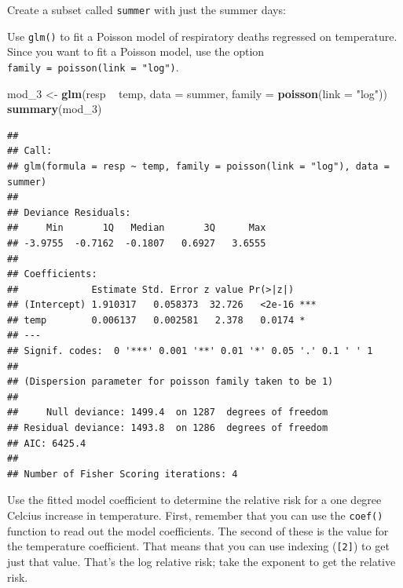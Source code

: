 \documentclass[]{book}
\makeatletter
\newenvironment{Shaded}{\begin{snugshade}}{\end{snugshade}}
\newcommand{\KeywordTok}[1]{\textcolor[rgb]{0.13,0.29,0.53}{\textbf{{#1}}}}
\newcommand{\DataTypeTok}[1]{\textcolor[rgb]{0.13,0.29,0.53}{{#1}}}
\newcommand{\DecValTok}[1]{\textcolor[rgb]{0.00,0.00,0.81}{{#1}}}
\newcommand{\StringTok}[1]{\textcolor[rgb]{0.31,0.60,0.02}{{#1}}}
\newcommand{\NormalTok}[1]{{#1}}
\newenvironment{kframe}{%
\medskip{}
\setlength{\fboxsep}{.8em}
 \def\at@end@of@kframe{}%
 \ifinner\ifhmode%
  \def\at@end@of@kframe{\end{minipage}}%
  \begin{minipage}{\columnwidth}%
 \fi\fi%
 \def\FrameCommand##1{\hskip\@totalleftmargin \hskip-\fboxsep
 \colorbox{shadecolor}{##1}\hskip-\fboxsep
     \hskip-\linewidth \hskip-\@totalleftmargin \hskip\columnwidth}%
 \MakeFramed {\advance\hsize-\width
   \@totalleftmargin\z@ \linewidth\hsize
   \@setminipage}}%
 {\par\unskip\endMakeFramed%
 \at@end@of@kframe}
\renewenvironment{Shaded}{\begin{kframe}}{\end{kframe}}
\makeatother
\begin{document}
Create a subset called \texttt{summer} with just the summer days:

\begin{Shaded}
\end{Shaded}

Use \texttt{glm()} to fit a Poisson model of respiratory deaths
regressed on temperature. Since you want to fit a Poisson model, use the
option \texttt{family\ =\ poisson(link\ =\ "log")}.

\begin{Shaded}
\begin{Highlighting}[]
\NormalTok{mod_3 <-}\StringTok{ }\KeywordTok{glm}\NormalTok{(resp ~}\StringTok{ }\NormalTok{temp, }\DataTypeTok{data =} \NormalTok{summer,}
             \DataTypeTok{family =} \KeywordTok{poisson}\NormalTok{(}\DataTypeTok{link =} \StringTok{"log"}\NormalTok{))}
\KeywordTok{summary}\NormalTok{(mod_3)}
\end{Highlighting}
\end{Shaded}

\begin{verbatim}
## 
## Call:
## glm(formula = resp ~ temp, family = poisson(link = "log"), data = summer)
## 
## Deviance Residuals: 
##     Min       1Q   Median       3Q      Max  
## -3.9755  -0.7162  -0.1807   0.6927   3.6555  
## 
## Coefficients:
##             Estimate Std. Error z value Pr(>|z|)    
## (Intercept) 1.910317   0.058373  32.726   <2e-16 ***
## temp        0.006137   0.002581   2.378   0.0174 *  
## ---
## Signif. codes:  0 '***' 0.001 '**' 0.01 '*' 0.05 '.' 0.1 ' ' 1
## 
## (Dispersion parameter for poisson family taken to be 1)
## 
##     Null deviance: 1499.4  on 1287  degrees of freedom
## Residual deviance: 1493.8  on 1286  degrees of freedom
## AIC: 6425.4
## 
## Number of Fisher Scoring iterations: 4
\end{verbatim}

Use the fitted model coefficient to determine the relative risk for a
one degree Celcius increase in temperature. First, remember that you can
use the \texttt{coef()} function to read out the model coefficients. The
second of these is the value for the temperature coefficient. That means
that you can use indexing (\texttt{{[}2{]}}) to get just that value.
That's the log relative risk; take the exponent to get the relative
risk.
\end{document}
